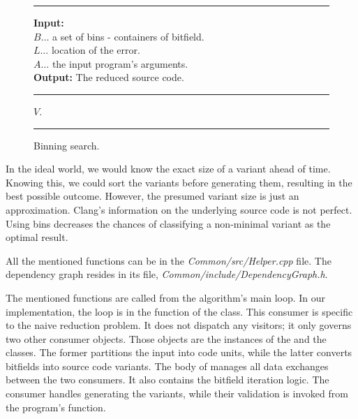 \begin{figure}[h]
	\hrule height.8pt depth0pt \kern2pt
	\textbf{Input:} \\
	\hspace*{\algorithmicindent} $B \ldots$ a set of bins - containers of bitfield. \\
	\hspace*{\algorithmicindent} $L \ldots$ location of the error. \\
	\hspace*{\algorithmicindent} $A \ldots$ the input program's arguments. \\
	\textbf{Output:} The reduced source code. 
	\hrule height.8pt depth0pt \kern2pt
	\begin{algorithmic}[1]
					\Return $V$.
				\EndIf
			\EndFor
		\EndFor
	\end{algorithmic} 
	\hrule height.8pt depth0pt \kern2pt
	\caption{Binning search.} 
	\label{alg:bins}
\end{figure}

In the ideal world, we would know the exact size of a variant ahead of time. 
Knowing this, we could sort the variants before generating them, resulting 
in the best possible outcome. 
However, the presumed variant size is just an approximation. 
Clang's information on the underlying source code is not perfect. 
Using bins decreases the chances of classifying a non-minimal variant as 
the optimal result.

All the mentioned functions can be in the \emph{Common/\-src/\-Helper.cpp} 
file. 
The dependency graph resides in its file, 
\emph{Common/\-include/\-DependencyGraph.h}.

The mentioned functions are called from the algorithm's main loop. 
In our implementation, the loop is in the  
function of the  class. 
This consumer is specific to the naive reduction problem. 
It does not dispatch any visitors; it only governs two other consumer 
objects. 
Those objects are the instances of 
the  and 
the  classes. 
The former partitions the input into code units, while the latter converts 
bitfields into source code variants. 
The body of  manages all data exchanges 
between the two consumers. 
It also contains the bitfield iteration logic. 
The consumer handles generating the variants, while their validation is 
invoked from the program's  function. 

